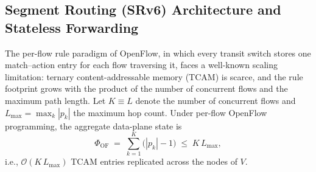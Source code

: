 
\subsection{Segment Routing (SRv6) Architecture and Stateless Forwarding}
\label{subsec:srv6}

The per-flow rule paradigm of OpenFlow, in which every transit switch stores
one match--action entry for each flow traversing it, faces a well-known
scaling limitation: ternary content-addressable memory (TCAM) is scarce, and
the rule footprint grows with the product of the number of concurrent flows
and the maximum path length. Let $K \equiv L$ denote the number of concurrent
flows and $L_{\max} = \max_k |p_k|$ the maximum hop count. Under per-flow
OpenFlow programming, the aggregate data-plane state is
\begin{equation}
\Phi_{\mathrm{OF}} \;=\; \sum_{k=1}^{K}\bigl(|p_k|-1\bigr) \;\le\; K\,L_{\max},
\label{eq:of_state}
\end{equation}
i.e., $\mathcal{O}(K\,L_{\max})$ TCAM entries replicated across the nodes of
$V$.

